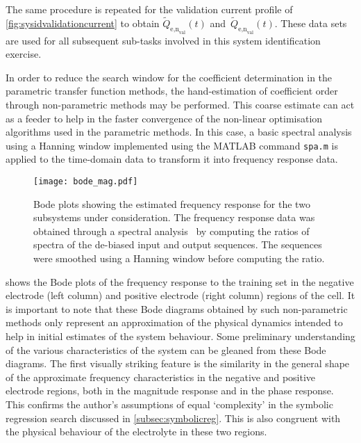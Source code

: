 The        same        procedure        is        repeated        for        the
validation       current      profile       of \cref{fig:sysidvalidationcurrent}
to         obtain         $\widetilde{Q}_{\text{e,n}_\text{val}}(t)$         and~$\widetilde{Q}_{\text{e,n}_\text{val}}(t)$.  These data  sets are  used for  all
subsequent sub-tasks involved in this system identification exercise.

In  order to  reduce  the search  window for  the  coefficient determination  in
the  parametric transfer  function methods,  the hand-estimation  of coefficient
order  through non-parametric  methods may  be performed.  This coarse  estimate
can  act as  a  feeder to  help  in  the faster  convergence  of the  non-linear
optimisation algorithms  used in the parametric  methods. In this case,  a basic
spectral analysis  using a Hanning  window implemented using the  MATLAB command
\texttt{spa.m} is applied to the time-domain data to transform it into frequency
response data.

\begin{figure}[!htb]
    \centering
    \texttt{[image: bode\_mag.pdf]}
    \caption[Bode plots of the electrolyte time-evolution sub-systems]{%
        Bode plots showing the  estimated frequency response  for the
        two  subsystems under  consideration.  The frequency  response data  was
        obtained  through a spectral  analysis \ie~by computing  the ratios  of
        spectra of the de-biased input  and output sequences. The sequences were
        smoothed using a Hanning window before computing the ratio.
    }%
    \label{fig:initialbodemag}
\end{figure}

  shows  the  Bode  plots  of  the  frequency response
to the training set in the negative electrode (left column) and positive
electrode (right column) regions of the cell. It is important to note that these
Bode diagrams obtained by such non-parametric methods only represent  an
approximation of the  physical dynamics intended to help in initial estimates of
the system behaviour. Some preliminary understanding of the  various
characteristics of the system can be gleaned from these Bode diagrams.  The
first visually striking feature is the similarity  in the  general shape of the
approximate frequency characteristics in  the negative  and positive electrode
regions, both in the magnitude response and in the phase response. This confirms
the author's assumptions of equal `complexity' in the symbolic  regression
search discussed in \cref{subsec:symbolicreg}.  This is also  congruent with
the physical  behaviour of  the electrolyte  in these  two regions.

